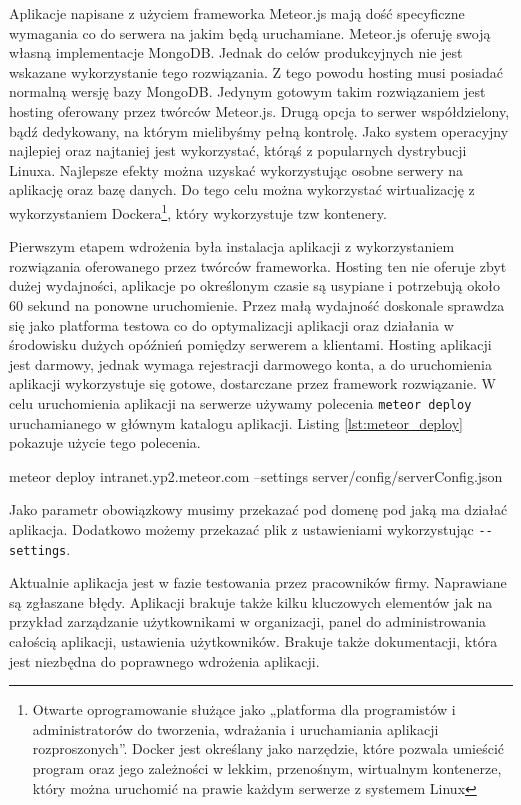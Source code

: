 Aplikacje napisane z użyciem frameworka Meteor.js mają dość specyficzne wymagania co do serwera na jakim będą uruchamiane. Meteor.js oferuję swoją własną implementacje MongoDB. Jednak do celów produkcyjnych nie jest wskazane wykorzystanie tego rozwiązania. Z tego powodu hosting musi posiadać normalną wersję bazy MongoDB. Jedynym gotowym takim rozwiązaniem jest hosting oferowany przez twórców Meteor.js. Drugą opcja to serwer współdzielony, bądź dedykowany, na którym mielibyśmy pełną kontrolę. Jako system operacyjny najlepiej oraz najtaniej jest wykorzystać, którąś z popularnych dystrybucji Linuxa. Najlepsze efekty można uzyskać wykorzystując osobne serwery na aplikację oraz bazę danych. Do tego celu można wykorzystać wirtualizację z wykorzystaniem Dockera\footnote{Otwarte oprogramowanie służące jako „platforma dla programistów i administratorów do tworzenia, wdrażania i uruchamiania aplikacji rozproszonych”. Docker jest określany jako narzędzie, które pozwala umieścić program oraz jego zależności w lekkim, przenośnym, wirtualnym kontenerze, który można uruchomić na prawie każdym serwerze z systemem Linux}, który wykorzystuje tzw kontenery. 

Pierwszym etapem wdrożenia była instalacja aplikacji z wykorzystaniem rozwiązania oferowanego przez twórców frameworka. Hosting ten nie oferuje zbyt dużej wydajności, aplikacje po określonym czasie są usypiane i potrzebują około 60 sekund na ponowne uruchomienie. Przez małą wydajność doskonale sprawdza się jako platforma testowa co do optymalizacji aplikacji oraz działania w środowisku dużych opóźnień pomiędzy serwerem a klientami. Hosting aplikacji jest darmowy, jednak wymaga rejestracji darmowego konta, a do uruchomienia aplikacji wykorzystuje się gotowe, dostarczane przez framework rozwiązanie. W celu uruchomienia aplikacji na serwerze używamy polecenia \verb|meteor deploy| uruchamianego w głównym katalogu aplikacji. Listing \ref{lst:meteor_deploy} pokazuje użycie tego polecenia. 
\begin{bash}[caption={Uruchomienie aplikacji na serwerze},label={lst:meteor_deploy}]
meteor deploy intranet.yp2.meteor.com --settings server/config/serverConfig.json
\end{bash}
Jako parametr obowiązkowy musimy przekazać pod domenę pod jaką ma działać aplikacja. Dodatkowo możemy przekazać plik z ustawieniami wykorzystując \verb|--settings|.

Aktualnie aplikacja jest w fazie testowania przez pracowników firmy. Naprawiane są zgłaszane błędy. Aplikacji brakuje także kilku kluczowych elementów jak na przykład zarządzanie użytkownikami w organizacji, panel do administrowania całością aplikacji, ustawienia użytkowników. Brakuje także dokumentacji, która jest niezbędna do poprawnego wdrożenia aplikacji.

